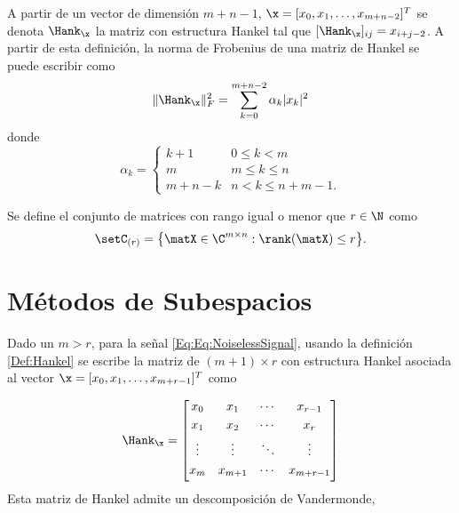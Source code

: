 		A partir de un vector de dimensión $m+n-1$, $\x = [x_0,x_1,\ldots,x_{m+n-2}]^T$ se denota $\Hank_{\x}$ la matriz con estructura Hankel tal que $[\Hank_{\x}]_{ij} = x_{i+j-2}$. A partir de esta definición, la norma de Frobenius de una matriz de Hankel se puede escribir como
		\begin{equation}
			\|\Hank_{\x}\|_F^2 = \sum_{k=0}^{m+n-2}\alpha_k|x_k|^2
			\label{Eq:Frobnorm}
		\end{equation}
		donde
		\[\alpha_k = \begin{cases} k+1 &  0 \leq k < m\\
		m &  m \leq k \leq n\\
		m+n-k & n < k \leq n+m-1.
		\end{cases}\]
	
		\begin{definition}
			Se define el conjunto de matrices con rango igual o menor que $r\in\N$ como
			\begin{equation}
				\setC_{(r)} = \big\{\matX\in\C^{m\times n}:\rank(\matX)\leq r\big\}.
				\label{Eq:SetRank_r}
			\end{equation}
		\end{definition}

%	
	
	\section{Métodos de Subespacios}

	Dado un $m>r$, para la señal \eqref{Eq:Eq:NoiselessSignal}, usando la definición \eqref{Def:Hankel} se escribe la matriz de $(m+1)\times r$ con estructura Hankel asociada al vector $\x = [x_0,x_1, \ldots,x_{m+r-1}]^T$ como

	\begin{equation}
		\Hank_{\x} = \begin{bmatrix} x_0 & x_1 & \cdots & x_{r-1} \\[0.3em]											x_1 & x_2 & \cdots & x_{r} \\[0.3em]
		\vdots & \vdots & \ddots & \vdots \\[0.3em]
		x_{m} & x_{m+1} & \cdots & x_{m+r-1}\\[0.3em]
		\end{bmatrix}
		\label{Eq:HankMatrix_1}
	\end{equation}
	Esta matriz de Hankel admite un descomposición de Vandermonde,

